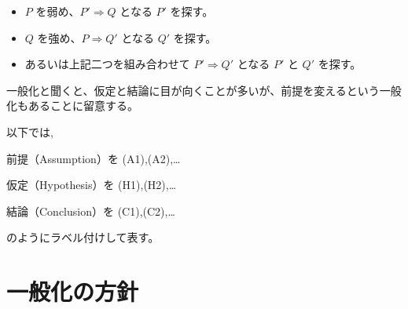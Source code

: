 \documentclass[a4paper,12pt]{bxjsbook}
\newlength{\customindent}
\newenvironment{body}{
  \par
  \begingroup
  \setlength{\leftskip}{\customindent}
  \setlength{\rightskip}{0pt}
  \setlength{\parindent}{1em}
  \setlength{\displayindent}{\customindent}
  \setlength{\displaywidth}{\dimexpr\linewidth-\customindent\relax}
}{
  \par
  \endgroup
}
\theoremstyle{theorem}
\begin{document}
    \begin{itemize}[leftmargin=3.5em]
        \item $P$ を弱め、$P'⇒Q$ となる $P'$ を探す。
        \item $Q$ を強め、$P⇒Q'$ となる $Q'$ を探す。
        \item あるいは上記二つを組み合わせて $P'⇒Q'$ となる $P'$ と $Q'$ を探す。
    \end{itemize}

    \begin{body}
        \indent 一般化と聞くと、仮定と結論に目が向くことが多いが、前提を変えるという一般化もあることに留意する。

        \indent 以下では,

        前提（Assumption）を (A1),(A2),\dots \par
        仮定（Hypothesis）を (H1),(H2),\dots \par
        結論（Conclusion）を (C1),(C2),\dots \par
        のようにラベル付けして表す。

    \end{body}

    \section{一般化の方針}
\end{document}
